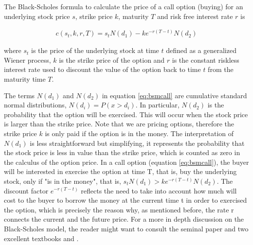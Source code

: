 \documentclass[11pt, onecolumn]{article}
\begin{document}
The Black-Scholes formula to calculate the price of a call option (buying) for an underlying stock  price $s$, strike price $k$, maturity $T$ and risk free interest rate $r$ is 

\begin{equation}
\begin{split}
 c(s_t,k,r,T)  = s_t N(d_1) - k e^{-r(T-t)}N(d_2)
 \end{split}
  \label{eq:bsmcall}
\end{equation}
 
where $s_t$ is the price of the underlying stock at time $t$ defined as a generalized Wiener process, $k$ is the strike price of the option and $r$ is the constant riskless interest rate used to discount the value of the option back to time $t$ from the maturity time $T$.

The terms $N(d_1)$ and $N(d_2)$ in equation \ref{eq:bsmcall} are cumulative standard normal distributions, $N(d_i) = P(x > d_i)$. In particular, $N(d_2)$ is the probability that the option will be exercised. This will occur when the stock price is larger than the strike price. Note that we are pricing options, therefore the strike price $k$ is only paid if the option is in the money. The interpretation of $N(d_1)$ is less straightforward but simplifying, it represents the probability that the stock price is less in value than the strike price, which is counted as zero in the calculus of the option price. In a call option (equation \ref{eq:bsmcall}), the buyer will be interested in exercise the option at time T, that is, buy the underlying stock, only if "is in the money", that is, $s_t N(d_1) > k e^{-r(T-t)}N(d_2)$. The discount factor $e^{-r(T-t)}$ reflects the need to take into account how much will cost to the buyer to borrow the money at the current time t in order to exercised the option, which is precisely the reason why, as mentioned before, the rate r connects the current and the future price. For a more in depth discussion on the Black-Scholes model, the reader might want to consult the seminal paper \citep{black_pricing_1973} and two excellent textbooks \citep{hull_options_2005} and \citep{duffie_dynamic_2001}.

\end{document}
